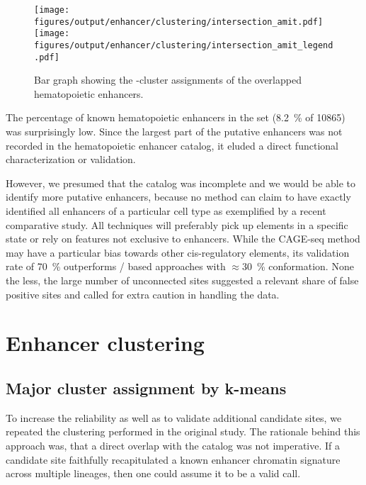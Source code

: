 \begin{figure}[htb]
	\texttt{[image: figures/output/enhancer/clustering/intersection\_amit.pdf]} 
	\texttt{[image: figures/output/enhancer/clustering/intersection\_amit\_legend.pdf]} 
	\caption{Bar graph showing the \hisfourone-cluster assignments of the overlapped hematopoietic enhancers.}
	\label{fig:enhancers:intersection_amit_clusters}
\end{figure}

The percentage of known hematopoietic enhancers in the set (\SI{8.2}{\percent} of \num{10865}) was surprisingly low. Since the largest part of the putative enhancers was not recorded in the hematopoietic enhancer catalog, it eluded a direct functional characterization or validation. 

However, we presumed that the catalog was incomplete and we would be able to identify more putative enhancers, because no method can claim to have exactly identified all enhancers of a particular cell type as exemplified by a recent comparative study\cite{Benton2019}. All techniques will preferably pick up elements in a specific state or rely on features not exclusive to enhancers. While the CAGE-seq method may have a particular bias towards other cis-regulatory elements\cite{Young2017}, its validation rate of \SI{70}{\percent}\cite{Andersson2014} outperforms \hisfourone / \histwentysevenac based approaches with $\approx$\SI{30}{\percent} conformation\cite{Kheradpour2013,Kwasnieski2014}. None the less, the large number of unconnected sites suggested a relevant share of false positive sites and called for extra caution in handling the data. 

\section{Enhancer clustering}
\label{chap:r:enhancers:cluster}

\subsection{Major cluster assignment by k-means}
\label{chap:r:enhancers:cluster:kmeans}

To increase the reliability as well as to validate additional candidate sites, we repeated the clustering performed in the original study\cite{Lara-Astiaso2014}. The rationale behind this approach was, that a direct overlap with the catalog was not imperative. If a candidate site faithfully recapitulated a known enhancer chromatin signature across multiple lineages, then one could assume it to be a valid call.  

